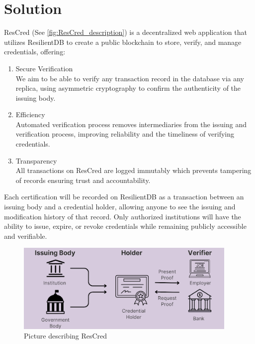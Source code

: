 \section{Solution}

ResCred (See \autoref{fig:ResCred_description}) is a decentralized web application that utilizes ResilientDB to create a public blockchain to store, verify, and manage credentials, offering:
\begin{enumerate}
    \item Secure Verification \\
        We aim to be able to verify any transaction record in the database via any replica, using asymmetric cryptography to confirm the authenticity of the issuing body.
    \item Efficiency \\
        Automated verification process removes intermediaries from the issuing and verification process, improving reliability and the timeliness of verifying credentials.
    \item Transparency \\
        All transactions on ResCred are logged immutably which prevents tampering of records ensuring trust and accountability.
\end{enumerate}
Each certification will be recorded on ResilientDB as a transaction between an issuing body and a credential holder, allowing anyone to see the issuing and modification history of that record. Only authorized institutions will have the ability to issue, expire, or revoke credentials while remaining publicly accessible and verifiable.

\begin{figure}
    \begin{center}
        \includegraphics[width=0.95\textwidth]{img/rescred_description.png}
    \end{center}
    \caption{Picture describing ResCred}\label{fig:ResCred_description}
\end{figure}

